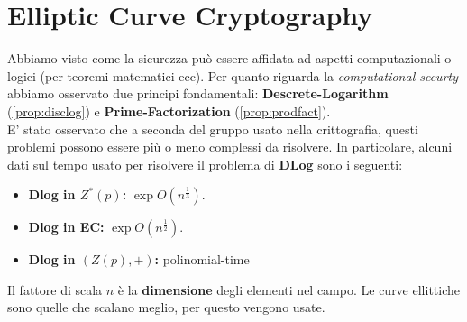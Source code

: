 \chapter{Elliptic Curve Cryptography}
Abbiamo visto come la sicurezza può essere affidata ad aspetti computazionali o logici (per teoremi matematici ecc). Per quanto riguarda la \textit{computational securty} abbiamo osservato due principi fondamentali: \textbf{Descrete-Logarithm} (\cref{prop:disclog}) e \textbf{Prime-Factorization} (\cref{prop:prodfact}).\\
E' stato osservato che a seconda del gruppo usato nella crittografia, questi problemi possono essere più o meno complessi da risolvere. In particolare, alcuni dati sul tempo usato per risolvere il problema di \textbf{DLog} sono i seguenti:
\begin{itemize}
    \item \textbf{Dlog in $Z^*(p)$:} $\exp{O(n^{\frac{1}{3}})}$.
    \item \textbf{Dlog in EC:} $\exp{O(n^{\frac{1}{2}})}$.
    \item \textbf{Dlog in $(Z(p),+)$:} polinomial-time
\end{itemize}
\begin{note}
Il fattore di scala $n$ è la \textbf{dimensione} degli elementi nel campo. Le curve ellittiche sono quelle che scalano meglio, per questo vengono usate.
\end{note}
